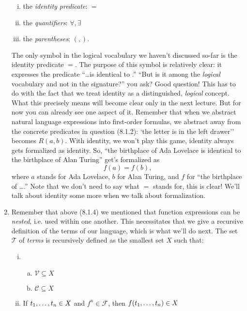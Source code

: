 \begin{enumerate}[\thesection.1]
\begin{enumerate}[(i)]
			\item the \emph{identity predicate}: $=$
			
			\item the \emph{quantifiers}: $\forall,\exists$
			
			\item the \emph{parentheses}: $(,)$.
		
		\end{enumerate}
		The only symbol in the logical vocabulary we haven't discussed so-far is the identity predicate $=$. The purpose of this symbol is relatively clear: it expresses the predicate ``\dots is identical to \underline{\phantom{\dots}}.'' ``But is it among the \emph{logical} vocabulary and not in the signature?'' you ask? Good question! This has to do with the fact that we treat identity as a distinguished, \emph{logical} concept. What this precisely means will become clear only in the next lecture. But for now you can already see one aspect of it. Remember that when we abstract natural language expressions into first-order formulas, we abstract away from the concrete predicates in question (8.1.2): `the letter is in the left drawer'' becomes $R(a,b)$. With identity, we won't play this game, identity always gets formalized as identity. So, ``the birthplace of Ada Lovelace is identical to the birthplace of Alan Turing'' get's formalized as \[f(a)=f(b),\] where $a$ stands for Ada Lovelace, $b$ for Alan Turing, and $f$ for ``the birthplace of \dots.'' Note that we don't need to say what $=$ stands for, this is clear! We'll talk about identity some more when we talk about formalization.
		
		\item Remember that above (8.1.4) we mentioned that function expressions can be \emph{nested}, i.e. used within one another. This necessitates that we give a recursive definition of the terms of our language, which is what we'll do next. The set $\mathcal{T}$ of \emph{terms} is recursively defined as the smallest set $X$ such that:
		\begin{enumerate}[(i)]
		
			\item \begin{enumerate}[(a)]
			\item $\mathcal{V}\subseteq X$
			\item $\mathcal{C}\subseteq X$
			\end{enumerate}
			\item If $t_1, \mathellipsis, t_n\in X$ and $f^n\in\mathcal{F}$, then $f(t_1, \mathellipsis, t_n)\in X$
		

\end{enumerate}
\end{enumerate}
